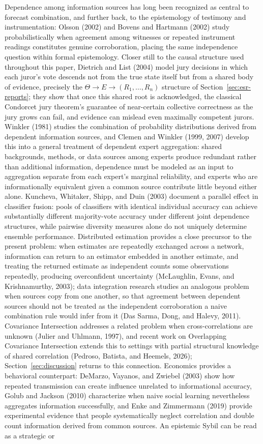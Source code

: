 \documentclass[11pt]{article}
\theoremstyle{definition}
\begin{document}
Dependence among information sources has long been recognized as central to forecast combination, and further back, to the epistemology of testimony and instrumentation: Olsson (2002) and Bovens and Hartmann (2002) study probabilistically when agreement among witnesses or repeated instrument readings constitutes genuine corroboration, placing the same independence question within formal epistemology. Closer still to the causal structure used throughout this paper, Dietrich and List (2004) model jury decisions in which each juror's vote descends not from the true state itself but from a shared body of evidence, precisely the $\Theta\rightarrow E\rightarrow(R_1,\ldots,R_n)$ structure of Section~\ref{sec:esr-reports}; they show that once this shared root is acknowledged, the classical Condorcet jury theorem's guarantee of near-certain collective correctness as the jury grows can fail, and evidence can mislead even maximally competent jurors. Winkler (1981) studies the combination of probability distributions derived from dependent information sources, and Clemen and Winkler (1999, 2007) develop this into a general treatment of dependent expert aggregation: shared backgrounds, methods, or data sources among experts produce redundant rather than additional information, dependence must be modeled as an input to aggregation separate from each expert's marginal reliability, and experts who are informationally equivalent given a common source contribute little beyond either alone. Kuncheva, Whitaker, Shipp, and Duin (2003) document a parallel effect in classifier fusion: pools of classifiers with identical individual accuracy can achieve substantially different majority-vote accuracy under different joint dependence structures, while pairwise diversity measures alone do not uniquely determine ensemble performance. Distributed estimation provides a close precursor to the present problem: when estimates are repeatedly exchanged across a network, information can return to an estimator embedded in another estimate, and treating the returned estimate as independent counts some observations repeatedly, producing overconfident uncertainty (McLaughlin, Evans, and Krishnamurthy, 2003); data integration research studies an analogous problem when sources copy from one another, so that agreement between dependent sources should not be treated as the independent corroboration a naive combination rule would infer from it (Das Sarma, Dong, and Halevy, 2011). Covariance Intersection addresses a related problem when cross-correlations are unknown (Julier and Uhlmann, 1997), and recent work on Overlapping Covariance Intersection extends this to settings with partial structural knowledge of shared correlation (Pedroso, Batista, and Heemels, 2026); Section~\ref{sec:discussion} returns to this connection. Economics provides a behavioral counterpart: DeMarzo, Vayanos, and Zwiebel (2003) show how repeated transmission can create influence unrelated to informational accuracy, Golub and Jackson (2010) characterize when naive social learning nevertheless aggregates information successfully, and Enke and Zimmermann (2019) provide experimental evidence that people systematically neglect correlation and double count information derived from common sources. An epistemic Sybil can be read as a strategic or 
\end{document}
